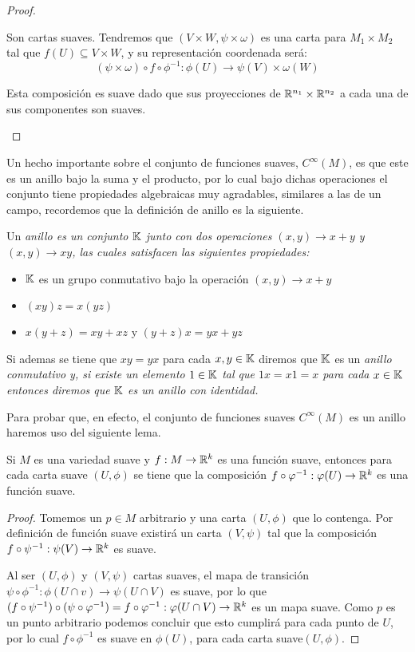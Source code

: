 \begin{proof}
\begin{itemize}
		      Son cartas suaves. Tendremos que $(V \times W, \psi \times \omega)$ es una carta para $M_1 \times M_2$ tal que $f(U) \subseteq V \times W$, y su representación coordenada será:
		      \[
			      (\psi \times \omega) \circ f \circ \phi^{-1}: \phi(U) \to \psi(V) \times \omega(W)
		      \]

		      Esta composición es suave dado que sus proyecciones de $\mathbb{R}^{n_1} \times \mathbb{R}^{n_2}$ a cada una de sus componentes son suaves.
	\end{itemize}
\end{proof}

Un hecho importante sobre el conjunto de funciones suaves, $C^{\infty}(M)$, es que este es un anillo bajo la suma y el producto, por lo cual bajo dichas operaciones el conjunto tiene propiedades algebraicas muy agradables, similares a las de un campo, recordemos que la definición de anillo es la siguiente.

\begin{definition}[Anillo]
	Un \it{anillo} es un conjunto $\mathbb{K}$ junto con dos operaciones $(x,y) \to x + y$ y $(x,y) \to xy$, las cuales satisfacen las siguientes propiedades:
	\begin{itemize}
		\item $\mathbb{K}$ es un grupo conmutativo bajo la operación $(x,y) \to x + y$
		\item $(xy)z = x(yz)$
		\item $x(y + z) = xy + xz$ y $(y+z)x = yx + yz$
	\end{itemize}
\end{definition}

Si ademas se tiene que $xy = yx$ para cada $x,y \in \mathbb{K}$ diremos que $\mathbb{K}$ es un \it{anillo conmutativo} y, si existe un elemento $1 \in \mathbb{K}$ tal que $1x = x1 = x$ para cada $x \in \mathbb{K}$ entonces diremos que $\mathbb{K}$ es un \it{anillo con identidad}.

Para probar que, en efecto, el conjunto de funciones suaves $C^{\infty}(M)$ es un anillo haremos uso del siguiente lema.

\begin{lemma}
	Si $M$ es una variedad suave y $f: M \to \mathbb{R}^{k}$ es una función suave, entonces para cada carta suave $(U,\phi)$ se tiene que la composición $f \circ \varphi^{-1}: \varphi(U) \to \mathbb{R}^{k}$ es una función suave.
\end{lemma}

\begin{proof}
  Tomemos un $p \in M$ arbitrario y una carta $(U, \phi)$ que lo contenga. Por definición de función suave existirá un carta $(V,\psi)$ tal que la composición $f \circ \psi^{-1}: \psi(V) \to \mathbb{R}^{k}$ es suave.

  Al ser $(U,\phi)$ y $(V,\psi)$ cartas suaves, el mapa de transición $\psi \circ \phi^{-1}: \phi(U \cap v) \to \psi(U \cap V)$ es suave, por lo que $(f \circ \psi^{-1}) \circ (\psi \circ \varphi^{-1}) = f \circ \varphi^{-1}: \varphi(U \cap V) \to \mathbb{R}^{k}$ es un mapa suave. Como $p$ es un punto arbitrario podemos concluir que esto cumplirá para cada punto de $U$, por lo cual $f \circ \phi^{-1}$ es suave en $\phi(U)$, para cada carta suave$(U,\phi)$.
\end{proof}

